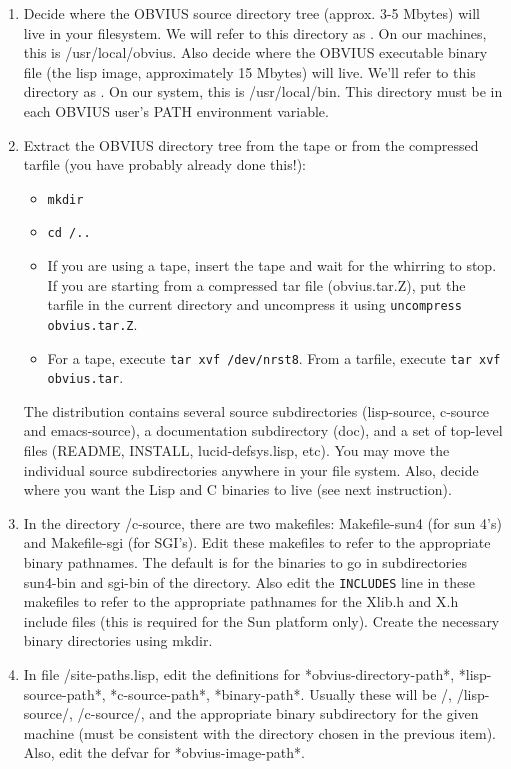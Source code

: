 \begin{enumerate}

\item 
Decide where the OBVIUS source directory tree (approx. 3-5 Mbytes)
will live in your filesystem.  We will refer to this directory as
.  On our machines, this is /usr/local/obvius. Also decide
where the OBVIUS executable binary file (the lisp image, approximately
15 Mbytes) will live. We'll refer to this directory as
.  On our system, this is /usr/local/bin.  This
directory must be in each OBVIUS user's PATH environment variable.

\item  
Extract the OBVIUS directory tree from the tape or from the
compressed tarfile (you have probably already done this!):
\begin{itemize}
\item	{\tt mkdir }
\item	{\tt cd /..}
\item	If you are using a tape, insert the tape and wait for the
whirring to stop.  If you are starting from a compressed tar file
(obvius.tar.Z), put the tarfile in the current directory and
uncompress it using {\tt uncompress obvius.tar.Z}.
\item	For a tape, execute {\tt tar xvf /dev/nrst8}.  From a
tarfile, execute {\tt tar xvf obvius.tar}.
\end{itemize}
The distribution contains several source subdirectories (lisp-source,
c-source and emacs-source), a documentation subdirectory (doc), and a
set of top-level files (README, INSTALL, lucid-defsys.lisp, etc).  You
may move the individual source subdirectories anywhere in your file
system.  Also, decide where you want the Lisp and C binaries to live
(see next instruction).

\item	
In the directory /c-source, there are two makefiles:
Makefile-sun4 (for sun 4's) and Makefile-sgi (for SGI's).  Edit these
makefiles to refer to the appropriate binary pathnames.  The default
is for the binaries to go in subdirectories sun4-bin and sgi-bin of
the  directory.  Also edit the {\tt INCLUDES} line in these
makefiles to refer to the appropriate pathnames for the Xlib.h and X.h
include files (this is required for the Sun platform only).  Create
the necessary binary directories using mkdir.

\item
In file /site-paths.lisp, edit the definitions for
*obvius-directory-path*, *lisp-source-path*, *c-source-path*,
*binary-path*.  Usually these will be /,
/lisp-source/, /c-source/, and the appropriate
binary subdirectory for the given machine (must be consistent with the
directory chosen in the previous item).  Also, edit the defvar for
*obvius-image-path*.


\end{enumerate}
